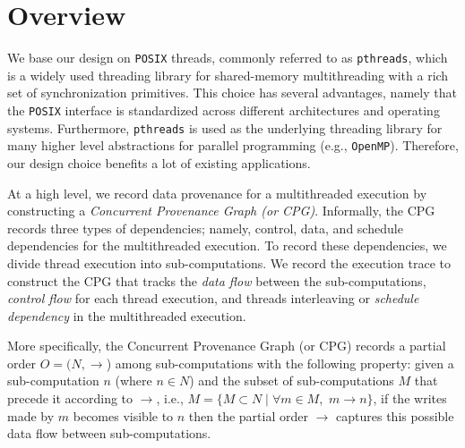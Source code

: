 \section{Overview}
\label{sec:overview}
%

We base our design on {\tt POSIX} threads, commonly referred to as
{\tt pthreads}, which is a widely used threading library for shared-memory
multithreading with a rich set of synchronization primitives.  This
choice has several advantages, namely that the {\tt POSIX} interface
is standardized across different architectures and operating systems. Furthermore, {\tt pthreads} is used as the underlying threading
library for many higher level abstractions for parallel programming
(e.g., {\tt OpenMP}). Therefore, our design choice benefits a lot of existing applications.



 At a high level, we record data provenance for a multithreaded execution by constructing a {\em Concurrent Provenance Graph (or CPG)}. Informally,  the CPG records three types of dependencies; namely, control, data, and schedule dependencies for the multithreaded execution. To record these dependencies, we divide thread execution into sub-computations. We record the execution trace to construct the CPG that tracks the {\em data flow} between the sub-computations, {\em control flow} for each thread execution, and threads interleaving or {\em schedule dependency}  in the multithreaded execution.

More specifically, the Concurrent Provenance Graph (or CPG) records a partial order $O = (N, \rightarrow$) among sub-computations with the following property: given a sub-computation $n$ (where $n \in N $)  and the subset of sub-computations $M$ that precede it according to $\rightarrow$, i.e., $M = \{M \subset N \mid \forall m \in M,$ $m \rightarrow n\}$, if the writes made by $m$ becomes visible to $n$ then the partial order $\rightarrow$ captures this possible data flow between sub-computations.

